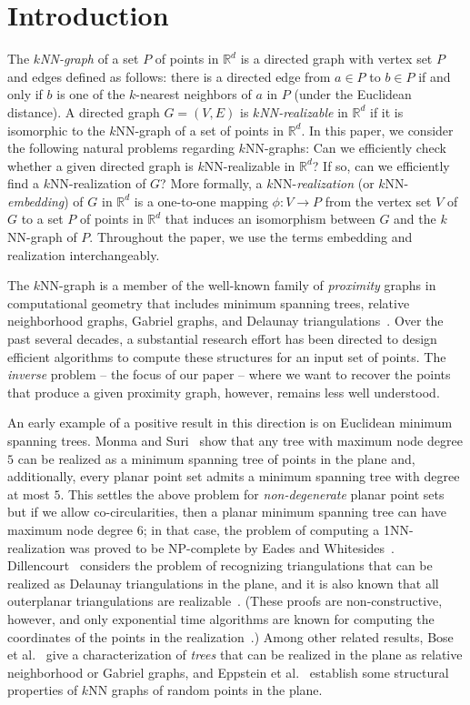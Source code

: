 \section{Introduction}

The \textit{$k$NN-graph} of a set $P$ of points in $\mathbb{R}^d$ is a directed graph with vertex set $P$ and edges defined as follows: there is a directed edge from $a \in P$ to $b \in P$ if and only if $b$ is one of the $k$-nearest neighbors of $a$ in $P$ (under the Euclidean distance).
A directed graph $G = (V, E)$ is \textit{$k$NN-realizable} in $\mathbb{R}^d$ if it is isomorphic to the $k$NN-graph of a set of points in $\mathbb{R}^d$.
In this paper, we consider the following natural problems regarding $k$NN-graphs:
Can we efficiently check whether a given directed graph is $k$NN-realizable in $\mathbb{R}^d$?
If so, can we efficiently find a $k$NN-realization of $G$?
More formally, a $k$NN-\emph{realization} (or $k$NN-\emph{embedding}) of $G$ in $\mathbb{R}^d$ is a one-to-one mapping $\phi: V \rightarrow P$ from the vertex set $V$ of $G$ to a set $P$ of points in $\mathbb{R}^d$ that induces an isomorphism between $G$ and the $k$NN-graph of $P$.
Throughout the paper, we use the terms embedding and realization interchangeably.

The $k$NN-graph is a member of the well-known family of \emph{proximity} graphs in computational geometry that includes minimum spanning trees, relative neighborhood graphs, Gabriel graphs, and Delaunay triangulations~\cite{cgbook}. Over the past several decades, a substantial research effort has been directed to design efficient algorithms to compute these structures for an input set of points.  The \emph{inverse} problem -- the focus of our paper -- where we want to recover the points that produce a given proximity graph, however, remains  less well understood.

An early example of a positive result in this direction is on Euclidean minimum spanning trees. Monma and Suri~\cite{monma:1992} show that any tree with maximum node degree $5$ can be realized as a minimum spanning tree of points in the plane and, additionally, every planar point set admits a minimum spanning tree with degree at most $5$. This settles the above problem for \textit{non-degenerate} planar point sets but if we allow co-circularities, then a planar minimum spanning tree can have maximum node degree $6$; in that case, the problem of computing a 1NN-realization was proved to be NP-complete by Eades and Whitesides~\cite{eades:1994}.
Dillencourt~\cite{dillencourt:1990} considers the problem of recognizing triangulations that can be realized as Delaunay triangulations in the plane, and it is also known that all outerplanar triangulations are realizable~\cite{sugihara:1994}. (These proofs are non-constructive, however, and only exponential time algorithms are known for computing the coordinates of the points in the realization~\cite{agrawal:2022}.)
Among other related results, Bose et al.~\cite{Jit-prox} give a characterization of  \emph{trees} that can be realized in the plane as relative neighborhood or Gabriel graphs, and Eppstein et al.~\cite{Epps-nn} establish some  structural properties of $k$NN graphs of random points in the plane.

